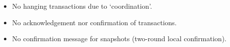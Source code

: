 \begin{itemize}
	\item No hanging transactions due to `coordination'.
	\item No acknowledgement nor confirmation of transactions.
	\item No confirmation message for snapshots (two-round local confirmation).
\end{itemize}

